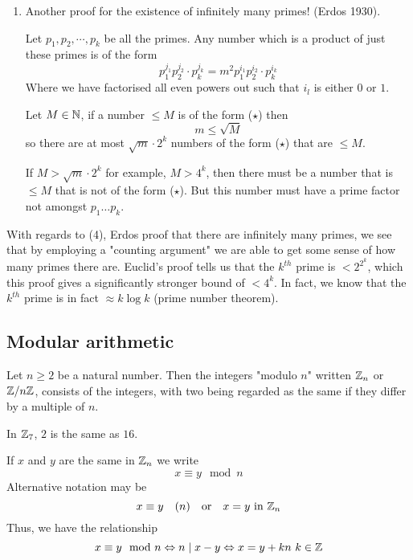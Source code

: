 \documentclass{article}
\begin{document}
\begin{enumerate}[label=(\arabic*)]
    \item Another proof for the existence of infinitely many primes! (Erdos 1930).
    
    Let $p_1, p_2, \cdots, p_k$ be all the primes. Any number which is a product of just these primes is of the form
    \[
        p_1^{j_1}p_2^{j_2}\cdot p_k^{j_k} = m^2 p_1^{i_1}p_2^{i_2}\cdot p_k^{i_k} \tag{$\star$}
    \]
    Where we have factorised all even powers out such that $i_l$ is either $0$ or $1$.

    Let $M \in \mathbb{N}$, if a number $\leq M$ is of the form ($\star$) then
    \[
        m \leq \sqrt{M}  
    \]
    so there are at most $\sqrt{m} \cdot 2^k$ numbers of the form ($\star$) that are $\leq M$.

    If $M > \sqrt{m} \cdot 2^k$ for example, $M > 4^k$, then there must be a number that is $\leq M$ that is not of the form ($\star$).
    But this number must have a prime factor not amongst $p_1 \ldots p_k$. \contradiction
\end{enumerate}

\begin{remark}
    With regards to (4), Erdos proof that there are infinitely many primes, we see that by employing a "counting argument" we are able to get some sense of how many primes there are.
    Euclid's proof tells us that the $k^{th}$ prime is $<2^{2^k}$, which this proof gives a significantly stronger bound of $<4^k$. In fact, we know that the $k^{th}$ prime is in fact $\approx k \log{k}$ (prime number theorem).
\end{remark}

\subsection{Modular arithmetic}

Let $n \geq 2$ be a natural number. Then the integers "modulo $n$" written $\mathbb{Z}_n$ or $\mathbb{Z}/n\mathbb{Z}$, consists of the integers, with two being regarded as the same if they differ by a multiple of $n$.

\begin{eg}[$\Z_7$]
    In $\Z_7$, $2$ is the same as $16$.
\end{eg}

\begin{defi}
    If $x$ and $y$ are the same in $\mathbb{Z}_n$ we write
    \[
        x \equiv y \mod n
    \]
    Alternative notation may be
    \[
        x \equiv y \quad (n) \quad \text{or} \quad x = y \ \text{in} \ \mathbb{Z}_n 
    \]
    Thus, we have the relationship
    \[
        x \equiv y \mod n \Leftrightarrow n \mid x - y \Leftrightarrow x = y + kn \ k \in \mathbb{Z}
    \]
\end{defi}
\end{document}
